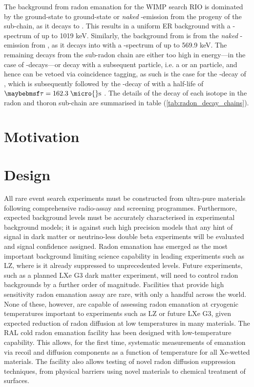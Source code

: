 The background from radon emanation for the WIMP search RIO is dominated by the ground-state to ground-state or \textit{naked} \beta-emission from the \PbTOF{} progeny of the \RnTTT{} sub-chain, as it decays to \BiTOF. This results in a uniform ER background with a \beta-spectrum of up to 1019 keV. Similarly, the background from \RnTTZ{} is from the \textit{naked} \beta-emission from \PbTOT{}, as it decays into \BiTOT{} with a \beta-spectrum of up to 569.9 keV. The remaining decays from the sub-radon chain are either too high in energy---in the case of \alpha-decays---or decay with a subsequent particle, i.e. a \gray{} or an \alpha particle, and hence can be vetoed via coincidence tagging, as such is the case for the \beta-decay of \BiTOF{}, which is subsequently followed by the \alpha-decay of \PbTOF{} with a half-life of $\tau{} = 162.3 \; \MathText{\micro{}s}$ \cite{radiogenic_muon_lux,Araujo:2011as}. The details of the decay of each isotope in the radon and thoron sub-chain are summarised in table (\ref{tab:radon_decay_chains}).


\section{Motivation}
\label{sec:motivation}



\section{Design}
\label{sec:motivation}



All rare event search experiments must be constructed from ultra-pure materials following comprehensive radio-assay and screening programmes. Furthermore, expected background levels must be accurately characterised in experimental background models; it is against such high precision models that any hint of signal in dark matter or neutrino-less double beta experiments will be evaluated and signal confidence assigned. Radon emanation has emerged as the most important background limiting science capability in leading experiments such as LZ, where is it already suppressed to unprecedented levels. Future experiments, such as a planned LXe G3 dark matter experiment, will need to control radon backgrounds by a further order of magnitude. Facilities that provide high sensitivity radon emanation assay are rare, with only a handful across the world. None of these, however, are capable of assessing radon emanation at cryogenic temperatures important to experiments such as LZ or future LXe G3, given expected reduction of radon diffusion at low temperatures in many materials. The RAL cold radon emanation facility has been designed with low-temperature capability. This allows, for the first time, systematic measurements of emanation via recoil and diffusion components as a function of temperature for all Xe-wetted materials. The facility also allows testing of novel radon diffusion suppression techniques, from physical barriers using novel materials to chemical treatment of surfaces.
 
